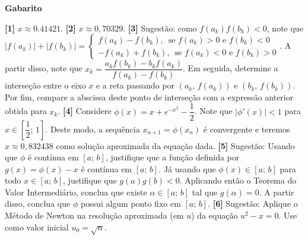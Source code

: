 \documentclass[12pt,a4paper]{article}
\begin{document}
\begin{center}
\textbf{Gabarito}
\end{center}
\textbf{[1]} $x\approx 0.41421$.
\textbf{[2]} $x\approx 0,70329$. 
\textbf{[3]} Sugestão: como $f(a_k)f(b_k)<0$, note que 
$|f(a_k)|+|f(b_k)| = \begin{cases}f(a_k) - f(b_k),\,\textrm{ se }f(a_k) > 0\textrm{ e } f(b_k) < 0\\ -f(a_k) + f(b_k),\,\textrm{ se }f(a_k) < 0\textrm{ e } f(b_k) > 0\end{cases}$. A partir disso, note que 
$x_k = \dfrac{a_kf(b_k) - b_kf(a_k)}{f(a_k) - f(b_k)}$. Em seguida, determine a interseção entre o eixo $x$ e a reta passando por $(a_k,\,f(a_k))$ e $(b_k,\,f(b_k))$. Por fim, 
compare a abscissa deste ponto de interseção com a expressão anterior obtida para $x_k$. 
\textbf{[4]} Considere $\phi(x) = x + e^{-x^2} - \dfrac{1}{2}$. Note que $|\phi'(x)| < 1$ para $x\in\left[\dfrac{1}{2};\,1\right]$. Deste modo, a sequência 
$x_{n+1}=\phi(x_n)$ é convergente e teremos $x\approx 0,832438$ como solução aproximada da equação dada. 
\textbf{[5]} Sugestão: Usando que $\phi$ é contínua em $[a;\,b]$, justifique que a função definida por $g(x) = \phi(x) - x$ é contínua em $[a;\,b]$. Já usando que $\phi(x)\in[a;\,b]$ para todo $x\in[a;\,b]$, justifique que $g(a)g(b) < 0$. 
Aplicando então o Teorema do Valor Intermediário, conclua que existe $\alpha\in[a;\,b]$ tal que $g(\alpha)=0$. A partir disso, conclua que $\phi$ possui algum ponto fixo em $[a;\,b]$. 
\textbf{[6]} Sugestão: Aplique o Método de Newton na resolução aproximada (em $u$) da equação $u^2 - x = 0$. Use como valor inicial $u_0 = \sqrt{n}$.
\end{document}
